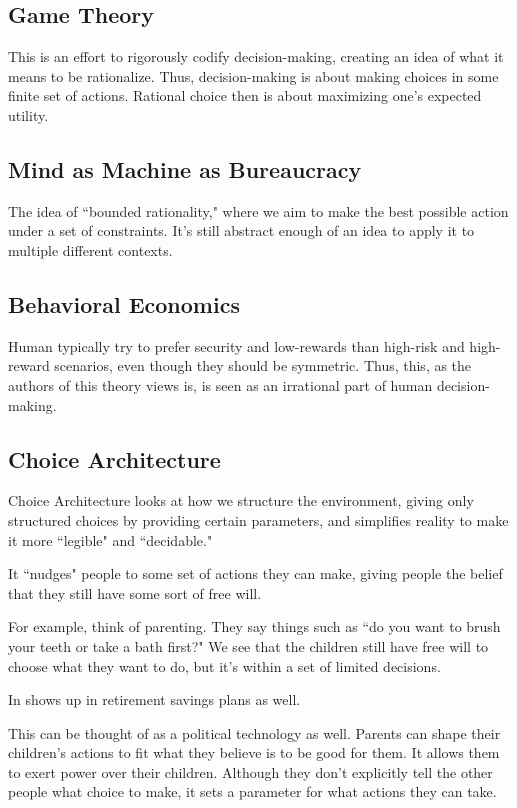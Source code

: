 \documentclass[openany]{book}
\begin{document}
\subsection{Game Theory}
This is an effort to rigorously codify decision-making, creating an idea of what it means to be rationalize. Thus, decision-making is about making choices in some finite set of actions. Rational choice then is about maximizing one's expected utility.

\subsection{Mind as Machine as Bureaucracy}
The idea of ``bounded rationality," where we aim to make the best possible action under a set of constraints. It's still abstract enough of an idea to apply it to multiple different contexts.

\subsection{Behavioral Economics}
Human typically try to prefer security and low-rewards than high-risk and high-reward scenarios, even though they should be symmetric. Thus, this, as the authors of this theory views is, is seen as an irrational part of human decision-making.

\subsection{Choice Architecture}
Choice Architecture looks at how we structure the environment, giving only structured choices by providing certain parameters, and simplifies reality to make it more ``legible" and ``decidable."

It ``nudges" people to some set of actions they can make, giving people the belief that they still have some sort of free will.

\begin{example}
	For example, think of parenting. They say things such as ``do you want to brush your teeth or take a bath first?" We see that the children still have free will to choose what they want to do, but it's within a set of limited decisions.
	
	In shows up in retirement savings plans as well.
\end{example}

This can be thought of as a political technology as well. Parents can shape their children's actions to fit what they believe is to be good for them. It allows them to exert power over their children. Although they don't explicitly tell the other people what choice to make, it sets a parameter for what actions they can take.
\end{document}
